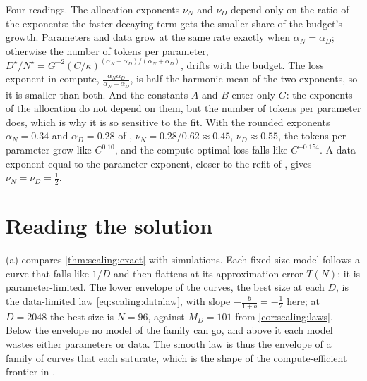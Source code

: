 \begin{refsection}
Four readings. The allocation exponents $\nu_N$ and $\nu_D$ depend only on the ratio of the exponents: the faster-decaying term gets the smaller share of the budget's growth. Parameters and data grow at the same rate exactly when $\alpha_N=\alpha_D$; otherwise the number of tokens per parameter, $D^\star/N^\star=G^{-2}(C/\kappa)^{(\alpha_N-\alpha_D)/(\alpha_N+\alpha_D)}$, drifts with the budget. The loss exponent in compute, $\frac{\alpha_N\alpha_D}{\alpha_N+\alpha_D}$, is half the harmonic mean of the two exponents, so it is smaller than both. And the constants $A$ and $B$ enter only $G$: the exponents of the allocation do not depend on them, but the number of tokens per parameter does, which is why it is so sensitive to the fit. With the rounded exponents $\alpha_N=0.34$ and $\alpha_D=0.28$ of \textcite{HoffmannEtAl2022}, $\nu_N=0.28/0.62\approx0.45$, $\nu_D\approx0.55$, the tokens per parameter grow like $C^{0.10}$, and the compute-optimal loss falls like $C^{-0.154}$. A data exponent equal to the parameter exponent, closer to the refit of \textcite{BesirogluEtAl2024}, gives $\nu_N=\nu_D=\frac12$.

\section{Reading the solution}\label{sec:scaling:reading}

(a) compares \cref{thm:scaling:exact} with simulations. Each fixed-size model follows a curve that falls like $1/D$ and then flattens at its approximation error $T(N)$: it is parameter-limited. The lower envelope of the curves, the best size at each $D$, is the data-limited law \eqref{eq:scaling:datalaw}, with slope $-\frac b{1+b}=-\frac12$ here; at $D=2048$ the best size is $N=96$, against $M_D=101$ from \cref{cor:scaling:laws}. Below the envelope no model of the family can go, and above it each model wastes either parameters or data. The smooth law is thus the envelope of a family of curves that each saturate, which is the shape of the compute-efficient frontier in \textcite{KaplanEtAl2020}.


\end{refsection}
